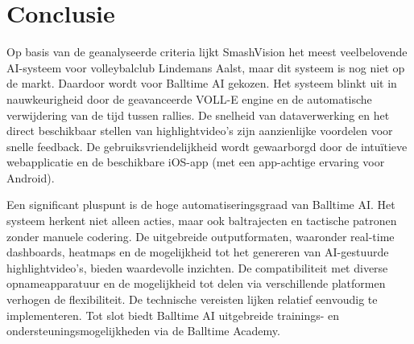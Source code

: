 \section{Conclusie}
Op basis van de geanalyseerde criteria lijkt SmashVision het meest veelbelovende AI-systeem voor volleybalclub Lindemans Aalst, maar dit systeem is nog niet op de markt. Daardoor wordt voor Balltime AI gekozen. Het systeem blinkt uit in nauwkeurigheid door de geavanceerde VOLL-E engine en de automatische verwijdering van de tijd tussen rallies. De snelheid van dataverwerking en het direct beschikbaar stellen van highlightvideo's zijn aanzienlijke voordelen voor snelle feedback. De gebruiksvriendelijkheid wordt gewaarborgd door de intuïtieve webapplicatie en de beschikbare iOS-app (met een app-achtige ervaring voor Android).

Een significant pluspunt is de hoge automatiseringsgraad van Balltime AI. Het systeem herkent niet alleen acties, maar ook baltrajecten en tactische patronen zonder manuele codering. De uitgebreide outputformaten, waaronder real-time dashboards, heatmaps en de mogelijkheid tot het genereren van AI-gestuurde highlightvideo's, bieden waardevolle inzichten. De compatibiliteit met diverse opnameapparatuur en de mogelijkheid tot delen via verschillende platformen verhogen de flexibiliteit. De technische vereisten lijken relatief eenvoudig te implementeren. Tot slot biedt Balltime AI uitgebreide trainings- en ondersteuningsmogelijkheden via de Balltime Academy.
